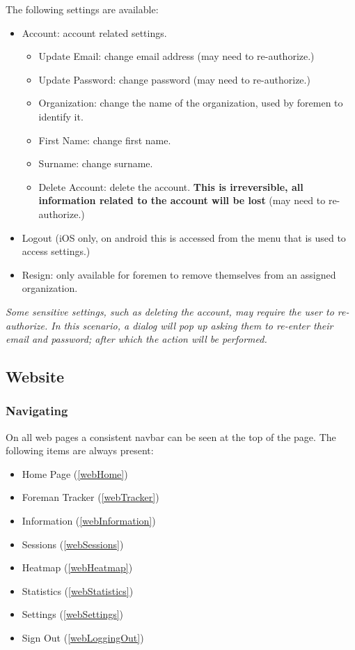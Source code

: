 \documentclass[11pt]{article}
\begin{document}
The following settings are available:
\begin{itemize}
 \item Account: account related settings.
 \begin{itemize}
  \item Update Email: change email address (may need to re-authorize.)
  \item Update Password: change password (may need to re-authorize.)
  \item Organization: change the name of the organization, used by foremen to identify it.
  \item First Name: change first name.
  \item Surname: change surname.
  \item Delete Account: delete the account. \textbf{This is irreversible, all information related to the account will be lost} (may need to re-authorize.)
 \end{itemize}
 \item Logout (iOS only, on android this is accessed from the menu that is used to access settings.)
 \item Resign: only available for foremen to remove themselves from an assigned organization.
\end{itemize}
\textit{Some sensitive settings, such as deleting the account, may require the user to re-authorize. In this scenario, a dialog will pop up asking them to re-enter their email and password; after which the action will be performed.}

\subsection{Website}
\subsubsection{Navigating}
\label{webNavigating}
On all web pages a consistent navbar can be seen at the top of the page. The following items are always present:
\begin{itemize}
 \item Home Page (\ref{webHome})
 \item Foreman Tracker (\ref{webTracker})
 \item Information (\ref{webInformation})
 \item Sessions (\ref{webSessions})
 \item Heatmap (\ref{webHeatmap})
 \item Statistics (\ref{webStatistics})
 \item Settings (\ref{webSettings})
 \item Sign Out (\ref{webLoggingOut})
\end{itemize}
\end{document}
